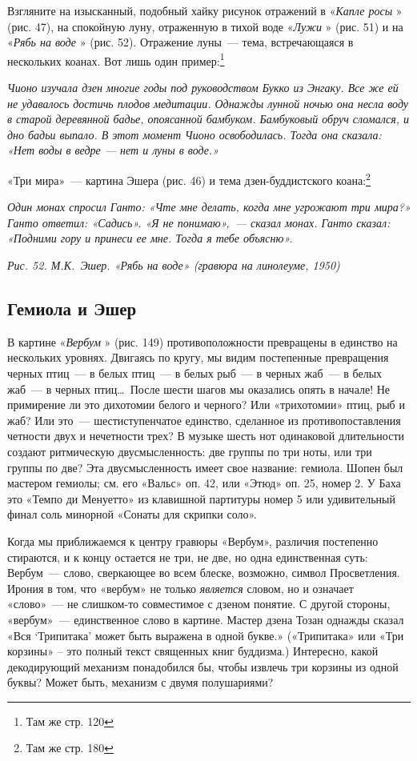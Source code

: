 \documentclass[../main.tex]{subfiles}
\begin{document}
Взгляните на изысканный, подобный хайку рисунок отражений в «\emph{Капле росы} » (рис. 47), на спокойную луну, отраженную в тихой воде «\emph{Лужи} » (рис. 51) и на «\emph{Рябь на воде} » (рис. 52). Отражение луны~--- тема, встречающаяся в нескольких коанах. Вот лишь один пример:\footnote{Там же стр. 120}

\emph{Чионо изучала дзен многие годы под руководством Букко из Энгаку. Все же ей не удавалось достичь плодов медитации. Однажды лунной ночью она несла воду в старой деревянной бадье, опоясанной бамбуком. Бамбуковый обруч сломался, и дно бадьи выпало. В этот момент Чионо освободилась. Тогда она сказала: «Нет воды в ведре --- нет и луны в воде.»}

«Три мира»~--- картина Эшера (рис. 46) и тема дзен-буддистского коана:\footnote{Там же стр. 180}

\emph{Один монах спросил Ганто: «Чте мне делать, когда мне угрожают три мира?» Ганто ответил: «Садись». «Я не понимаю»,~--- сказал монах. Ганто сказал: «Подними гору и принеси ее мне. Тогда я тебе объясню».}

\emph{Рис. 52. М.К.~Эшер. «Рябь на воде» (гравюра на линолеуме, 1950)}


\subsection{Гемиола и Эшер}

В картине «\emph{Вербум} » (рис. 149) противоположности превращены в единство на нескольких уровнях. Двигаясь по кругу, мы видим постепенные превращения черных птиц~--- в белых птиц~--- в белых рыб~--- в черных жаб~--- в белых жаб~--- в черных птиц\ldots~После шести шагов мы оказались опять в начале! Не примирение ли это дихотомии белого и черного? Или «трихотомии» птиц, рыб и жаб? Или это~--- шестиступенчатое единство, сделанное из противопоставления четности двух и нечетности трех? В музыке шесть нот одинаковой длительности создают ритмическую двусмысленность: две группы по три ноты, или три группы по две? Эта двусмысленность имеет свое название: гемиола. Шопен был мастером гемиолы; см. его «Вальс» оп. 42, или «Этюд» оп. 25, номер 2. У Баха это «Темпо ди Менуетто» из клавишной партитуры номер 5 или удивительный финал соль минорной «Сонаты для скрипки соло».

Когда мы приближаемся к центру гравюры «Вербум», различия постепенно стираются, и к концу остается не три, не две, но одна единственная суть: Вербум~--- слово, сверкающее во всем блеске, возможно, символ Просветления. Ирония в том, что «вербум» не только \emph{является} словом, но и означает «слово»~--- не слишком-то совместимое с дзеном понятие. С другой стороны, «вербум»~--- единственное слово в картине. Мастер дзена Тозан однажды сказал «Вся \enquote*{Трипитака} может быть выражена в одной букве.» («Трипитака» или «Три корзины» \--- это полный текст священных книг буддизма.) Интересно, какой декодирующий механизм понадобился бы, чтобы извлечь три корзины из одной буквы? Может быть, механизм с двумя полушариями?
\end{document}
